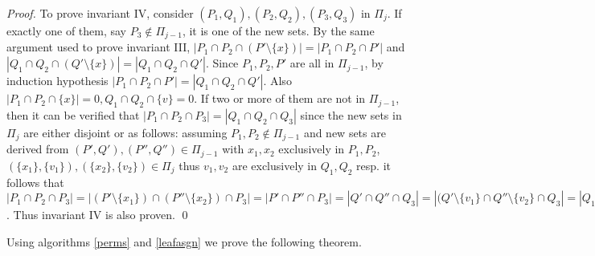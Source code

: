 \documentclass{llncs}
\begin{document}
\begin{proof}
  \noindent
  To prove invariant IV, consider $(P_1,Q_1),(P_2,Q_2), (P_3,Q_3)$ in
  $\Pi_j$. If exactly one of them, say $P_3 \notin \Pi_{j-1}$, it is one of the new sets. By the same argument used to
  prove invariant III, $|P_1 \cap P_2 \cap (P'
  \setminus \{x\})| = |P_1 \cap P_2 \cap P'|$ 
  and $|Q_1 \cap Q_2 \cap (Q' \setminus \{x\})| = |Q_1 \cap Q_2 \cap
  Q'|$. Since $P_1, P_2, P'$ are all in $\Pi_{j-1}$, by induction hypothesis
  $|P_1 \cap P_2 \cap P'| = |Q_1 \cap Q_2 \cap Q'|$. Also $|P_1 \cap
  P_2 \cap \{x\}| = 0, Q_1 \cap Q_2 \cap \{v\} = 0$. 
  If two or more of them are not in $\Pi_{j-1}$, then it can
  be verified that $|P_1
  \cap P_2 \cap P_3| = |Q_1 \cap Q_2 \cap Q_3|$ since the new sets
  in $\Pi_j$ are either disjoint or as follows: assuming $P_1, P_2
  \notin \Pi_{j-1}$ and new sets are derived from $(P', Q'), (P'', Q'') \in
  \Pi_{j-1}$ with $x_1, x_2$
  exclusively in $P_1, P_2$, $(\{x_1\},\{v_1\}), (\{x_2\},\{v_2\})
  \in \Pi_j $ thus $v_1, v_2$ are exclusively in $Q_1, Q_2$ resp. it
  follows that
$|P_1
  \cap P_2 \cap P_3| = |(P' \setminus \{x_1\}) \cap (P'' \setminus
  \{x_2\}) \cap P_3| = |P' \cap P'' \cap P_3| = |Q' \cap Q'' \cap Q_3|
  = |(Q' \setminus \{v_1\} \cap Q'' \setminus \{v_2\} \cap Q_3| =
  |Q_1 \cap Q_2 \cap Q_3|$. Thus invariant
  IV is also proven.
  \qed
\end{proof}

\noindent
Using algorithms \ref{perms} and \ref{leafasgn} we prove the following
theorem.
\end{document}
